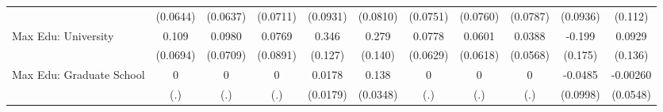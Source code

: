 {\begin{tabular}{l*{10}{c}}
            &    (0.0644)         &    (0.0637)         &    (0.0711)         &    (0.0931)         &    (0.0810)         &    (0.0751)         &    (0.0760)         &    (0.0787)         &    (0.0936)         &     (0.112)         \\
\addlinespace
Max Edu: University&       0.109         &      0.0980         &      0.0769         &       0.346\sym{**} &       0.279\sym{*}  &      0.0778         &      0.0601         &      0.0388         &      -0.199         &      0.0929         \\
            &    (0.0694)         &    (0.0709)         &    (0.0891)         &     (0.127)         &     (0.140)         &    (0.0629)         &    (0.0618)         &    (0.0568)         &     (0.175)         &     (0.136)         \\
\addlinespace
Max Edu: Graduate School&           0         &           0         &           0         &      0.0178         &       0.138\sym{***}&           0         &           0         &           0         &     -0.0485         &    -0.00260         \\
            &         (.)         &         (.)         &         (.)         &    (0.0179)         &    (0.0348)         &         (.)         &         (.)         &         (.)         &    (0.0998)         &    (0.0548)         \\
\bottomrule
\end{tabular}
}
